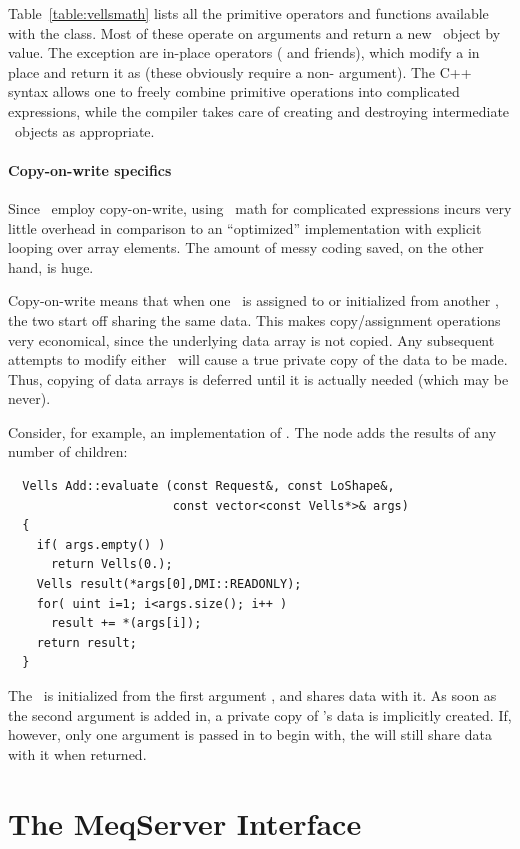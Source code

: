   Table~\ref{table:vellsmath} lists all the primitive operators and functions 
  available with the  class. Most of these operate on 
  arguments and return a new \Vells\ object by value. The exception are 
  in-place operators ( and friends), which modify a  in
  place and return it as  (these obviously require a
  non- argument). The C++ syntax allows one to freely combine
  primitive operations into complicated expressions, while the compiler takes
  care of creating and destroying intermediate \Vells\ objects as appropriate.

  \subsubsection{Copy-on-write specifics}

  Since \Vells\ employ copy-on-write, using \Vells\ math for complicated
  expressions incurs very little overhead in comparison to an ``optimized''
  implementation with explicit looping over array elements. The amount of
  messy coding saved, on the other hand, is huge. 
  
  Copy-on-write means that when one \Vells\ is assigned to or initialized from
  another \Vells, the two start off sharing the same data. This makes 
  copy/assignment operations very economical, since the underlying data array 
  is not copied. Any subsequent attempts to modify either \Vells\ will cause a
  true private copy of the data to be made. Thus, copying of data arrays is
  deferred until it is actually needed (which may be never). 

  Consider, for example, an implementation of . The 
  node adds the results of any number of children:

  \begin{verbatim}  
  Vells Add::evaluate (const Request&, const LoShape&,
                       const vector<const Vells*>& args)
  {
    if( args.empty() )
      return Vells(0.);
    Vells result(*args[0],DMI::READONLY);
    for( uint i=1; i<args.size(); i++ )
      result += *(args[i]);
    return result;
  }
  \end{verbatim}  
  
  The  \Vells\ is initialized from the first argument \Vells, and
  shares data with it. As soon as the second argument is added in, a private 
  copy of 's data is implicitly created. If, however, only one
  argument is passed in to begin with, the  will still share data
  with it when returned.

\chapter{The MeqServer Interface}
\label{chap:meqserver}
\label{sec:meqserver}
\label{sec:meqforest}


  
  
